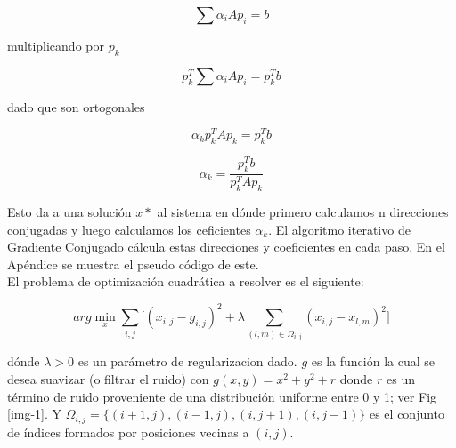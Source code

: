 \documentclass[conference]{IEEEtran}
\begin{document}
\begin{equation*}
	\sum \alpha_i A p_i = b
\end{equation*}

multiplicando por $p_k$

\begin{equation*}
	p_k^T \sum \alpha_i A p_i = p_k^T b
\end{equation*}

dado que son ortogonales

\begin{equation*}
	\alpha_k p_k^T A p_k = p_k^T b
\end{equation*}

\begin{equation*}
	\alpha_k = \frac{p_k^T b}{p_k^T A p_k}
\end{equation*}

Esto da a una solución $x*$ al sistema en dónde primero calculamos n direcciones conjugadas y luego
calculamos los ceficientes $\alpha_k$. El algoritmo iterativo de Gradiente Conjugado cálcula estas
direcciones y coeficientes en cada paso. En el Apéndice se muestra el pseudo código de este.\\

El problema de optimización cuadrática a resolver es el siguiente:

\begin{equation}
	arg \min_{x} \sum_{i,j} \Big[
		(x_{i,j} - g_{i,j})^2 + \lambda \sum_{(l,m) \in \Omega_{i,j}} (x_{i,j} - x_{l,m})^2
	\Big]
\end{equation}

dónde $\lambda > 0$ es un parámetro de regularizacion dado. $g$ es la función la cual se desea
suavizar (o filtrar el ruido) con $g(x,y) = x^2 + y^2 + r$ donde $r$ es un término de ruido
proveniente de una distribución uniforme entre 0 y 1; ver Fig \ref{img-1}. Y
$\Omega_{i,j} = \{(i+1, j), (i-1, j), (i, j+1), (i, j-1) \}$ es el conjunto de índices formados por
posiciones vecinas a $(i,j)$.
\end{document}
